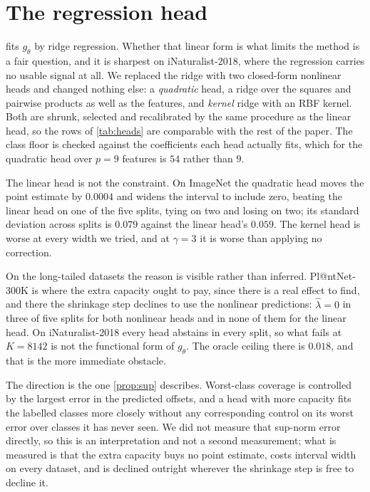 \section{The regression head}
\label{app:heads}

 fits $g_\theta$ by ridge regression. Whether that linear form is what
limits the method is a fair question, and it is sharpest on iNaturalist-2018, where the
regression carries no usable signal at all. We replaced the ridge with two closed-form
nonlinear heads and changed nothing else: a \emph{quadratic} head, a ridge over the squares
and pairwise products as well as the features, and \emph{kernel} ridge with an RBF kernel.
Both are shrunk, selected and recalibrated by the same procedure as the linear head, so the
rows of \cref{tab:heads} are comparable with the rest of the paper. The class floor is checked
against the coefficients each head actually fits, which for the quadratic head over $p=9$
features is $54$ rather than $9$.

The linear head is not the constraint. On ImageNet the quadratic head moves the point estimate
by $0.0004$ and widens the interval to include zero, beating the linear head on one of the five
splits, tying on two and losing on two; its standard deviation across splits is $0.079$ against
the linear head's $0.059$. The kernel head is worse at every width we tried, and at
$\gamma=3$ it is worse than applying no correction.

On the long-tailed datasets the reason is visible rather than inferred. Pl@ntNet-300K is where
the extra capacity ought to pay, since there is a real effect to find, and there the shrinkage
step declines to use the nonlinear predictions: $\hat\lambda=0$ in three of five splits for
both nonlinear heads and in none of them for the linear head. On iNaturalist-2018 every head
abstains in every split, so what fails at $K=8142$ is not the functional form of $g_\theta$.
The oracle ceiling there is $0.018$, and that is the more immediate obstacle.

The direction is the one \cref{prop:sup} describes. Worst-class coverage is controlled by the
largest error in the predicted offsets, and a head with more capacity fits the labelled classes
more closely without any corresponding control on its worst error over classes it has never
seen. We did not measure that sup-norm error directly, so this is an interpretation and not a
second measurement; what is measured is that the extra capacity buys no point estimate, costs
interval width on every dataset, and is declined outright wherever the shrinkage step is free
to decline it.

